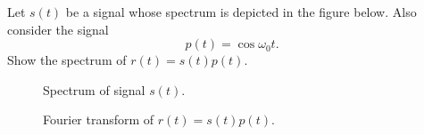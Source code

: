 \begin{frame}[plain]
    \begin{example}
        Let $s(t)$ be a signal whose spectrum is depicted in the figure below. Also consider the signal
        \begin{equation*}
            p(t) = \cos\omega_0 t.
        \end{equation*}
        Show the spectrum of $r(t) = s(t)p(t)$.

        \begin{figure}
          \centering
          
          \caption{Spectrum of signal $s(t)$.}\label{fi:signal_for_modulation}
        \end{figure}
    \end{example}
\end{frame}
\begin{frame}[plain]
    {
        \begin{figure}
          \centering
          
          \caption{Fourier transform of $r(t) = s(t)p(t)$.}\label{fi:modulation_property}
        \end{figure}
    }


\end{frame}
